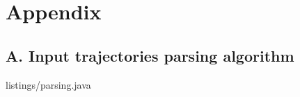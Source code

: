 \section*{Appendix}
\subsection*{A. Input trajectories parsing algorithm}

\lstset{style=code-style-java}
 {listings/parsing.java}
